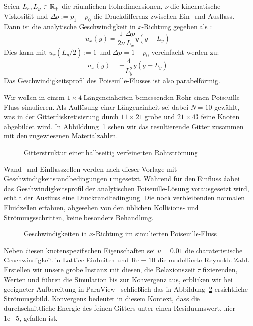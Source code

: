 \begin{Definition}
	Seien \(L_x, L_y \in \mathbb{R}_+\) die räumlichen Rohrdimensionen, \(\nu\) die kinematische Viskosität und \(\Delta p := p_1 - p_0\) die Druckdifferenz zwischen Ein- und Ausfluss. Dann ist die analytische Geschwindigkeit in \(x\)-Richtung gegeben als \cite[vgl.~Kap.~4]{bao11}:
\[u_x(y) = \frac{1}{2\nu} \frac{\Delta p}{L_x} y (y-L_y)\]
Dies kann mit \(u_x(L_y/2):=1\) und \(\Delta p = 1 - p_0\) vereinfacht werden zu:
\[u_x(y) = -\frac{4}{L_y^2} y (y-L_y)\]
Das Geschwindigkeitsprofil des Poiseuille-Flusses ist also parabelförmig.
\end{Definition}

Wir wollen in einem \(1 \times 4\) Längeneinheiten bemessenden Rohr einen Poiseuille-Fluss simulieren. Als Auflösung einer Längeneinheit sei dabei \(N=10\) gewählt, was in der Gitterdiskretisierung durch \(11 \times 21\) grobe und \(21 \times 43\) feine Knoten abgebildet wird. In Abbilddung~\ref{fig:PoiseuilleGridSetup} sehen wir das resultierende Gitter zusammen mit den zugewiesenen Materialzahlen.

\begin{figure}[h]
\begin{adjustbox}{center}

\end{adjustbox}
\caption{Gitterstruktur einer halbseitig verfeinerten Rohrströmung}
\label{fig:PoiseuilleGridSetup}
\end{figure}

Wand- und Einflusszellen werden nach dieser Vorlage mit Geschwindigkeitsrandbedingungen umgesetzt. Während für den Einfluss dabei das Geschwindigkeitsprofil der analytischen Poiseuille-Lösung vorausgesetzt wird, erhält der Ausfluss eine Druckrandbedingung. Die noch verbleibenden normalen Fluidzellen erfahren, abgesehen von den üblichen Kollisions- und Strömungsschritten, keine besondere Behandlung.

\begin{figure}[h]
\begin{adjustbox}{center}

\end{adjustbox}
\caption{Geschwindigkeiten in \(x\)-Richtung im simulierten Poiseuille-Fluss}
\label{fig:PoiseuilleVelocityGrid}
\end{figure}

Neben diesen knotenspezifischen Eigenschaften sei \(u=0.01\) die charateristische Geschwindigkeit in Lattice-Einheiten und \(\text{Re}=10\) die modellierte Reynolds-Zahl. Erstellen wir unsere grobe  Instanz mit diesen, die Relaxionszeit \(\tau\) fixierenden, Werten und führen die Simulation bis zur Konvergenz aus, erblicken wir bei geeigneter Aufbereitung in ParaView~\cite{paraview05} schließlich das in Abbildung~\ref{fig:PoiseuilleVelocityGrid} ersichtliche Strömungsbild. Konvergenz bedeutet in diesem Kontext, dass die durchschnittliche Energie des feinen Gitters unter einen Residuumswert, hier \(1\mathrm{e}{-5}\), gefallen ist.

